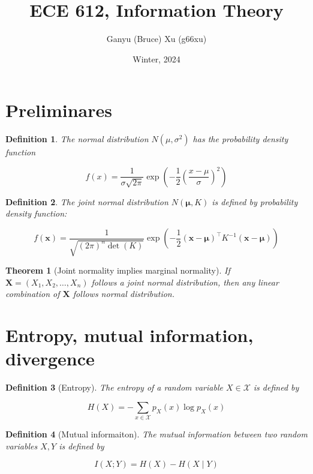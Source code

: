 \documentclass{article}
\title{ECE 612, Information Theory}
\author{Ganyu (Bruce) Xu (g66xu)}
\date{Winter, 2024}
\newtheorem{definition}{Definition}[section]
\newtheorem{theorem}{Theorem}[section]
\begin{document}
\maketitle

\section*{Preliminares}
    \begin{definition}
        The normal distribution $N(\mu, \sigma^2)$ has the probability density function

        $$
        f(x) = \frac{1}{\sigma\sqrt{2\pi}}\exp(-\frac{1}{2}(\frac{x-\mu}{\sigma})^2)
        $$
    \end{definition}

    \begin{definition}
        The joint normal distribution $N(\mathbf{\mu}, K)$ is defined by probability density function:

        $$
        f(\mathbf{x}) = \frac{1}{\sqrt{(2\pi)^n\det(K)}}
        \exp(-\frac{1}{2}
            (\mathbf{x} - \mathbf{\mu})^\intercal
            K^{-1}
            (\mathbf{x} - \mathbf{\mu})
        )
        $$
    \end{definition}

    \begin{theorem}[Joint normality implies marginal normality]
        If $\mathbf{X} = (X_1, X_2, \ldots, X_n)$ follows a joint normal distribution, then any linear combination of $\mathbf{X}$ follows normal distribution.
    \end{theorem}

\section{Entropy, mutual information, divergence}
    \begin{definition}[Entropy]
    The entropy of a random variable $X \in \mathcal{X}$ is defined by

        \begin{equation*}
            H(X) = -\sum_{x \in \mathcal{X}}p_X(x)\log{p_X(x)}
        \end{equation*}
    \end{definition}

    \begin{definition}[Mutual informaiton]
    The mutual information between two random variables $X, Y$ is defined by

    \begin{equation*}
        I(X; Y) = H(X) - H(X \mid Y)
    \end{equation*}
    \end{definition}
\end{document}
